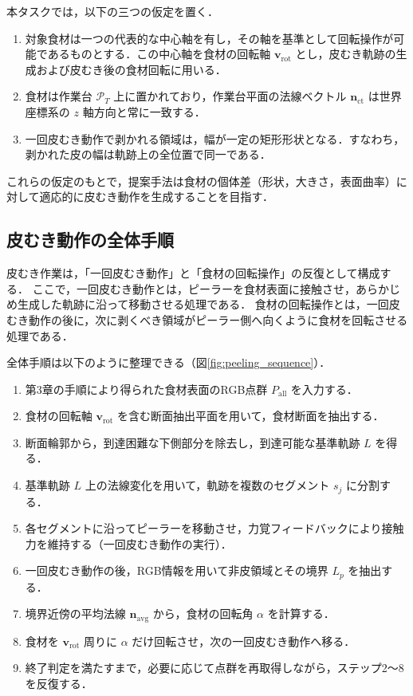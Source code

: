 本タスクでは，以下の三つの仮定を置く．

\begin{enumerate}
  \item 対象食材は一つの代表的な中心軸を有し，その軸を基準として回転操作が可能であるものとする．この中心軸を食材の回転軸 $\mathbf{v}_{\mathrm{rot}}$ とし，皮むき軌跡の生成および皮むき後の食材回転に用いる．
  \item 食材は作業台 $\mathcal{P}_T$ 上に置かれており，作業台平面の法線ベクトル $\mathbf{n}_{\mathrm{ct}}$ は世界座標系の $z$ 軸方向と常に一致する．
  \item 一回皮むき動作で剥かれる領域は，幅が一定の矩形形状となる．すなわち，剥かれた皮の幅は軌跡上の全位置で同一である．
\end{enumerate}

これらの仮定のもとで，提案手法は食材の個体差（形状，大きさ，表面曲率）に対して適応的に皮むき動作を生成することを目指す．

\subsection{皮むき動作の全体手順}

皮むき作業は，「一回皮むき動作」と「食材の回転操作」の反復として構成する．
ここで，一回皮むき動作とは，ピーラーを食材表面に接触させ，あらかじめ生成した軌跡に沿って移動させる処理である．
食材の回転操作とは，一回皮むき動作の後に，次に剥くべき領域がピーラー側へ向くように食材を回転させる処理である．

全体手順は以下のように整理できる（図\ref{fig:peeling_sequence}）．

\begin{enumerate}
  \item 第3章の手順により得られた食材表面のRGB点群 $P_{\mathrm{all}}$ を入力する．
  \item 食材の回転軸 $\mathbf{v}_{\mathrm{rot}}$ を含む断面抽出平面を用いて，食材断面を抽出する．
  \item 断面輪郭から，到達困難な下側部分を除去し，到達可能な基準軌跡 $L$ を得る．
  \item 基準軌跡 $L$ 上の法線変化を用いて，軌跡を複数のセグメント $s_j$ に分割する．
  \item 各セグメントに沿ってピーラーを移動させ，力覚フィードバックにより接触力を維持する（一回皮むき動作の実行）．
  \item 一回皮むき動作の後，RGB情報を用いて非皮領域とその境界 $L_p$ を抽出する．
  \item 境界近傍の平均法線 $\mathbf{n}_{\mathrm{avg}}$ から，食材の回転角 $\alpha$ を計算する．
  \item 食材を $\mathbf{v}_{\mathrm{rot}}$ 周りに $\alpha$ だけ回転させ，次の一回皮むき動作へ移る．
  \item 終了判定を満たすまで，必要に応じて点群を再取得しながら，ステップ2〜8を反復する．
\end{enumerate}

